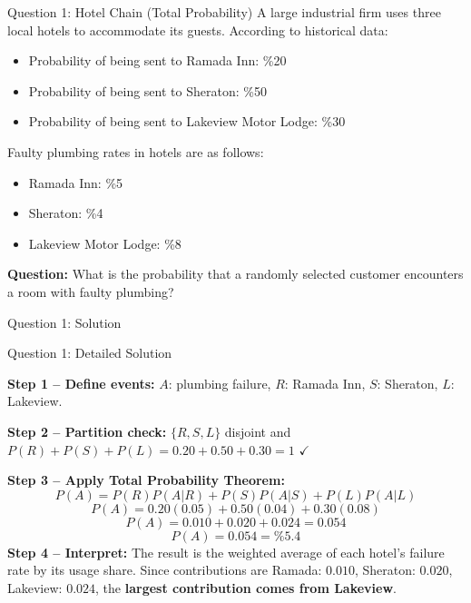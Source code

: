 \documentclass[light]{lutbeamer}
\begin{document}
\begin{frame}{Question 1: Hotel Chain (Total Probability)}
    A large industrial firm uses three local hotels to accommodate its guests. According to historical data:
    \begin{itemize}
        \item Probability of being sent to Ramada Inn: \%20
        \item Probability of being sent to Sheraton: \%50
        \item Probability of being sent to Lakeview Motor Lodge: \%30
    \end{itemize}

    Faulty plumbing rates in hotels are as follows:
    \begin{itemize}
        \item Ramada Inn: \%5
        \item Sheraton: \%4
        \item Lakeview Motor Lodge: \%8
    \end{itemize}

    \textbf{Question:} What is the probability that a randomly selected customer encounters a room with faulty plumbing?
\end{frame}

\begin{frame}{Question 1: Solution}
    \vspace{5cm}
\end{frame}

\begin{frame}[allowframebreaks]{Question 1: Detailed Solution}
    \footnotesize
    {\color{red}
    \textbf{Step 1 -- Define events:}
    $A$: plumbing failure, $R$: Ramada Inn, $S$: Sheraton, $L$: Lakeview.

    \textbf{Step 2 -- Partition check:}
    $\{R,S,L\}$ disjoint and $P(R)+P(S)+P(L)=0.20+0.50+0.30=1$ $\checkmark$

    \textbf{Step 3 -- Apply Total Probability Theorem:}
    \[
    P(A)=P(R)P(A|R)+P(S)P(A|S)+P(L)P(A|L)
    \]
    \[
    P(A)=0.20(0.05)+0.50(0.04)+0.30(0.08)
    \]
    \[
    P(A)=0.010+0.020+0.024=0.054
    \]
    \[
    \boxed{P(A)=0.054=\%5.4}
    \]
    \textbf{Step 4 -- Interpret:} The result is the weighted average of each hotel's failure rate by its usage share. Since contributions are Ramada: $0.010$, Sheraton: $0.020$, Lakeview: $0.024$, the \textbf{largest contribution comes from Lakeview}.
    }
\end{frame}
\end{document}
